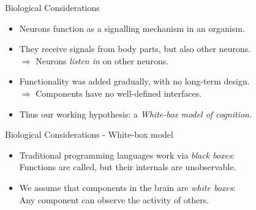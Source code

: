 \documentclass{beamer}
\begin{document}
   

   \begin{frame}{Biological Considerations}
      \begin{itemize}
         \item Neurons function as a signalling mechanism in an organism.
         \pause
         \item They receive signals from body parts, but also other neurons.\\
            $\Rightarrow$ Neurons \emph{listen in} on other neurons.
         \pause
         \item Functionality was added gradually, with no long-term design.\\
            $\Rightarrow$ Components have no well-defined interfaces.
         \pause
         \item Thus our working hypothesis: a \emph{White-box model of cognition}.
       \end{itemize}
   \end{frame}
   
   \begin{frame}{Biological Considerations - White-box model}
      \begin{itemize}
         \item Traditional programming languages work via \emph{black boxes}:\\
              \vspace{2mm}
               Functions are called, but their internals are unobservable.
               \vspace{2mm}
         \item We assume that components in the brain are \emph{white boxes}:\\
              \vspace{2mm}
               Any component can observe the activity of others.
      \end{itemize}
   \end{frame}
   
\end{document}
